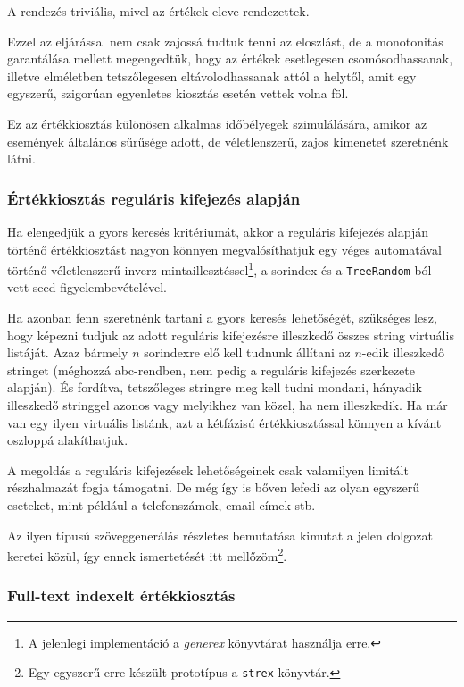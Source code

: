 \documentclass[
    parspace,
    noindent,
    nohyp,
]{elteiktdk}[2023/04/10]
\begin{document}
A rendezés triviális, mivel az értékek eleve rendezettek.

Ezzel az eljárással nem csak zajossá tudtuk tenni az eloszlást,
de a monotonitás garantálása mellett megengedtük,
hogy az értékek esetlegesen csomósodhassanak,
illetve elméletben tetszőlegesen eltávolodhassanak attól a helytől,
amit egy egyszerű, szigorúan egyenletes kiosztás esetén vettek volna föl.

Ez az értékkiosztás különösen alkalmas időbélyegek szimulálására,
amikor az események általános sűrűsége adott,
de véletlenszerű, zajos kimenetet szeretnénk látni.

\subsubsection{Értékkiosztás reguláris kifejezés alapján}

Ha elengedjük a gyors keresés kritériumát,
akkor a reguláris kifejezés alapján történő értékkiosztást nagyon könnyen megvalósíthatjuk
egy véges automatával történő véletlenszerű inverz mintaillesztéssel\footnote{
  A jelenlegi implementáció a \textit{generex} könyvtárat használja erre.
},
a sorindex és a \texttt{TreeRandom}-ból vett seed figyelembevételével.

Ha azonban fenn szeretnénk tartani a gyors keresés lehetőségét,
szükséges lesz, hogy képezni tudjuk az adott reguláris kifejezésre illeszkedő összes string virtuális listáját.
Azaz bármely $n$ sorindexre elő kell tudnunk állítani az $n$-edik illeszkedő stringet
(méghozzá abc-rendben, nem pedig a reguláris kifejezés szerkezete alapján).
És fordítva, tetszőleges stringre meg kell tudni mondani,
hányadik illeszkedő stringgel azonos vagy melyikhez van közel, ha nem illeszkedik.
Ha már van egy ilyen virtuális listánk, azt a kétfázisú értékkiosztással könnyen a kívánt oszloppá alakíthatjuk.

A megoldás a reguláris kifejezések lehetőségeinek csak valamilyen limitált részhalmazát fogja támogatni.
De még így is bőven lefedi az olyan egyszerű eseteket, mint például a telefonszámok, email-címek stb.

Az ilyen típusú szöveggenerálás részletes bemutatása kimutat a jelen dolgozat keretei közül,
így ennek ismertetését itt mellőzöm\footnote{
  Egy egyszerű erre készült prototípus a \texttt{strex} könyvtár.
}.

\subsubsection{Full-text indexelt értékkiosztás}
\end{document}
